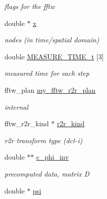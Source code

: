 \begin{CompactItemize}
\begin{CompactList}\small\item\em flags for the fftw \item\end{CompactList}\item 
\hypertarget{structnfct__plan_5635e780f4c492f087754d71f16e07ed}{
double $\ast$ \hyperlink{structnfct__plan_5635e780f4c492f087754d71f16e07ed}{x}}
\label{structnfct__plan_5635e780f4c492f087754d71f16e07ed}

\begin{CompactList}\small\item\em nodes (in time/spatial domain) \item\end{CompactList}\item 
\hypertarget{structnfct__plan_cd69baad39feaa27f34c063960b173f0}{
double \hyperlink{structnfct__plan_cd69baad39feaa27f34c063960b173f0}{MEASURE\_\-TIME\_\-t} \mbox{[}3\mbox{]}}
\label{structnfct__plan_cd69baad39feaa27f34c063960b173f0}

\begin{CompactList}\small\item\em measured time for each step \item\end{CompactList}\item 
fftw\_\-plan \hyperlink{structnfct__plan_ef8278033ffe571d2bf7193be013929d}{my\_\-fftw\_\-r2r\_\-plan}
\begin{CompactList}\small\item\em internal \item\end{CompactList}\item 
\hypertarget{structnfct__plan_1f6a337f580e879fcf2672c4cedce56d}{
fftw\_\-r2r\_\-kind $\ast$ \hyperlink{structnfct__plan_1f6a337f580e879fcf2672c4cedce56d}{r2r\_\-kind}}
\label{structnfct__plan_1f6a337f580e879fcf2672c4cedce56d}

\begin{CompactList}\small\item\em r2r transform type (dct-i) \item\end{CompactList}\item 
\hypertarget{structnfct__plan_a217dda883fc3533b95bf6ab6ccff888}{
double $\ast$$\ast$ \hyperlink{structnfct__plan_a217dda883fc3533b95bf6ab6ccff888}{c\_\-phi\_\-inv}}
\label{structnfct__plan_a217dda883fc3533b95bf6ab6ccff888}

\begin{CompactList}\small\item\em precomputed data, matrix D \item\end{CompactList}\item 
\hypertarget{structnfct__plan_d3886151e655110a1c5ba71a66439e2b}{
double $\ast$ \hyperlink{structnfct__plan_d3886151e655110a1c5ba71a66439e2b}{psi}}
\label{structnfct__plan_d3886151e655110a1c5ba71a66439e2b}


\end{CompactItemize}
